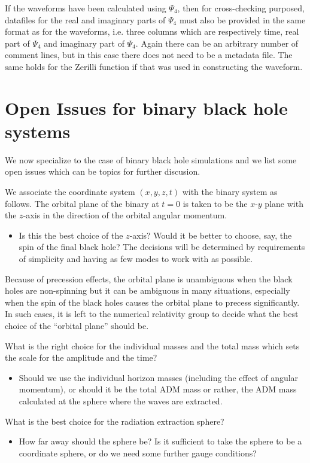\documentclass{article}
\numberwithin{equation}{section}
\begin{document}
If the waveforms have been calculated using $\Psi_4$, then for
cross-checking purposed, datafiles for the real and imaginary parts of
$\Psi_4$ must also be provided in the same format as for the
waveforms, i.e. three columns which are respectively time, real part
of $\Psi_4$ and imaginary part of $\Psi_4$.  Again there can be an
arbitrary number of comment lines, but in this case there does not
need to be a metadata file.  The same holds for the Zerilli function
if that was used in constructing the waveform. 


\section{Open Issues for binary black hole systems}
\label{sec:openissues}

We now specialize to the case of binary black hole simulations and we
list some open issues which can be topics for further discusion.  

We associate the coordinate system $(x,y,z,t)$ with the binary system
as follows.  The orbital plane of the binary at $t=0$ is taken to be
the $x$-$y$ plane with the $z$-axis in the direction of the orbital
angular momentum.
\begin{itemize}
\item Is this the best choice of the $z$-axis?  Would it be better to
  choose, say, the spin of the final black hole? The decisions will be
  determined by requirements of simplicity and having as few modes to
  work with as possible.  
\end{itemize}
Because of precession effects, the orbital plane is unambiguous when
the black holes are non-spinning but it can be ambiguous in many
situations, especially when the spin of the black holes causes the
orbital plane to precess significantly.  In such cases, it is left to
the numerical relativity group to decide what the best choice of the
``orbital plane'' should be.

What is the right choice for the individual masses and the total mass
which sets the scale for the amplitude and the time?
\begin{itemize}
\item Should we use the individual horizon masses (including the
  effect of angular momentum), or should it be the total ADM mass or
  rather, the ADM mass calculated at the sphere where the waves are
  extracted.  
\end{itemize}

What is the best choice for the radiation extraction sphere?
\begin{itemize}
\item How far away should the sphere be?  Is it sufficient to take the
  sphere to be a coordinate sphere, or do we need some further gauge
  conditions?  
\end{itemize}
\end{document}
